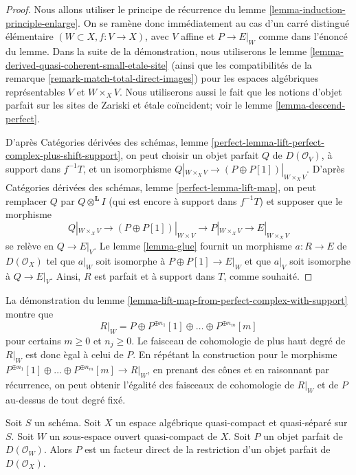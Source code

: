 \begin{proof}
Nous allons utiliser le principe de r\'ecurrence du lemme
\ref{lemma-induction-principle-enlarge}. On se ram\`ene donc imm\'ediatement
au cas d'un carr\'e distingu\'e \'el\'ementaire
$(W\subset X,f:V\to X)$, avec $V$ affine et $P\to E|_W$ comme dans l'\'enonc\'e
du lemme. Dans la suite de la d\'emonstration, nous utiliserons le lemme
\ref{lemma-derived-quasi-coherent-small-etale-site} (ainsi que les
compatibilit\'es de la remarque \ref{remark-match-total-direct-images}) pour
les espaces alg\'ebriques repr\'esentables $V$ et $W\times_XV$. Nous
utiliserons aussi le fait que les notions d'objet parfait sur les sites de
Zariski et \'etale co\"incident; voir le lemme \ref{lemma-descend-perfect}.

\medskip\noindent
D'apr\`es Cat\'egories d\'eriv\'ees des sch\'emas, lemme
\ref{perfect-lemma-lift-perfect-complex-plus-shift-support}, on peut choisir un
objet parfait $Q$ de $D(\mathcal{O}_V)$, \`a support dans $f^{-1}T$, et un
isomorphisme
$Q|_{W\times_XV}\to(P\oplus P[1])|_{W\times_XV}$. D'apr\`es Cat\'egories
d\'eriv\'ees des sch\'emas, lemme \ref{perfect-lemma-lift-map}, on peut
remplacer $Q$ par $Q\otimes^\mathbf{L}I$ (qui est encore \`a support dans
$f^{-1}T$) et supposer que le morphisme
$$
Q|_{W \times_X V} \to (P \oplus P[1])|_{W \times V}
\longrightarrow P|_{W \times_X V}
\longrightarrow
E|_{W \times_X V}
$$
se rel\`eve en $Q\to E|_V$. Le lemme \ref{lemma-glue} fournit un morphisme
$a:R\to E$ de $D(\mathcal{O}_X)$ tel que $a|_W$ soit isomorphe \`a
$P\oplus P[1]\to E|_W$ et que $a|_V$ soit isomorphe \`a $Q\to E|_V$.
Ainsi, $R$ est parfait et \`a support dans $T$, comme souhait\'e.
\end{proof}

\begin{remark}
\label{remark-addendum}
La d\'emonstration du lemme
\ref{lemma-lift-map-from-perfect-complex-with-support} montre que
$$
R|_W = P \oplus P^{\oplus n_1}[1] \oplus \ldots \oplus P^{\oplus n_m}[m]
$$
pour certains $m\geq0$ et $n_j\geq0$. Le faisceau de cohomologie de plus haut
degr\'e de $R|_W$ est donc \`egal \`a celui de $P$. En r\'ep\'etant la
construction pour le morphisme
$P^{\oplus n_1}[1]\oplus\ldots\oplus P^{\oplus n_m}[m]\to R|_W$, en prenant
des c\^ones et en raisonnant par r\'ecurrence, on peut obtenir l'\'egalit\'e des
faisceaux de cohomologie de $R|_W$ et de $P$ au-dessus de tout degr\'e fix\'e.
\end{remark}

\begin{lemma}
\label{lemma-direct-summand-of-a-restriction}
Soit $S$ un sch\'ema. Soit $X$ un espace alg\'ebrique quasi-compact et
quasi-s\'epar\'e sur $S$. Soit $W$ un sous-espace ouvert quasi-compact de $X$.
Soit $P$ un objet parfait de $D(\mathcal{O}_W)$. Alors $P$ est un facteur
direct de la restriction d'un objet parfait de $D(\mathcal{O}_X)$.
\end{lemma}

